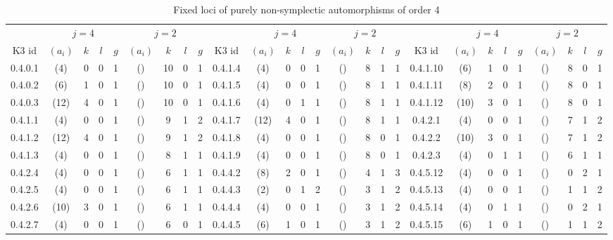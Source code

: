 {\small\centering\setlength{\tabcolsep}{3pt}
\begin{longtable}{ccccccccc|ccccccccc|ccccccccc}
\caption{Fixed loci of purely non-symplectic automorphisms of order 4}\\
 & \multicolumn{4}{c}{$j = 4$} & \multicolumn{4}{c}{$j = 2$} & & \multicolumn{4}{c}{$j = 4$} & \multicolumn{4}{c}{$j = 2$} & & \multicolumn{4}{c}{$j = 4$} & \multicolumn{4}{c}{$j = 2$}\\
\cmidrule(lr){2-5}
\cmidrule(lr){6-9}
\cmidrule(lr){11-14}
\cmidrule(lr){15-18}
\cmidrule(lr){20-23}
\cmidrule(lr){24-27}
K3 id & $(a_i)$ & $k$ & $l$ & $g$ & $(a_i)$ & $k$ & $l$ & $g$ & K3 id & $(a_i)$ & $k$ & $l$ & $g$ & $(a_i)$ & $k$ & $l$ & $g$ & K3 id & $(a_i)$ & $k$ & $l$ & $g$ & $(a_i)$ & $k$ & $l$ & $g$\\
\hline
\endhead
\rowcolor{lightgray}
0.4.0.1 & (4) & 0 & 0 & 1 & () & 10 & 0 & 1 & 0.4.1.4 & (4) & 0 & 0 & 1 & () & 8 & 1 & 1 & 0.4.1.10 & (6) & 1 & 0 & 1 & () & 8 & 0 & 1\\
0.4.0.2 & (6) & 1 & 0 & 1 & () & 10 & 0 & 1 & 0.4.1.5 & (4) & 0 & 0 & 1 & () & 8 & 1 & 1 & 0.4.1.11 & (8) & 2 & 0 & 1 & () & 8 & 0 & 1\\
\rowcolor{lightgray}
0.4.0.3 & (12) & 4 & 0 & 1 & () & 10 & 0 & 1 & 0.4.1.6 & (4) & 0 & 1 & 1 & () & 8 & 1 & 1 & 0.4.1.12 & (10) & 3 & 0 & 1 & () & 8 & 0 & 1\\
0.4.1.1 & (4) & 0 & 0 & 1 & () & 9 & 1 & 2 & 0.4.1.7 & (12) & 4 & 0 & 1 & () & 8 & 1 & 1 & 0.4.2.1 & (4) & 0 & 0 & 1 & () & 7 & 1 & 2\\
\rowcolor{lightgray}
0.4.1.2 & (12) & 4 & 0 & 1 & () & 9 & 1 & 2 & 0.4.1.8 & (4) & 0 & 0 & 1 & () & 8 & 0 & 1 & 0.4.2.2 & (10) & 3 & 0 & 1 & () & 7 & 1 & 2\\
0.4.1.3 & (4) & 0 & 0 & 1 & () & 8 & 1 & 1 & 0.4.1.9 & (4) & 0 & 0 & 1 & () & 8 & 0 & 1 & 0.4.2.3 & (4) & 0 & 1 & 1 & () & 6 & 1 & 1\\
\rowcolor{lightgray}
0.4.2.4 & (4) & 0 & 0 & 1 & () & 6 & 1 & 1 & 0.4.4.2 & (8) & 2 & 0 & 1 & () & 4 & 1 & 3 & 0.4.5.12 & (4) & 0 & 0 & 1 & () & 0 & 2 & 1\\
0.4.2.5 & (4) & 0 & 0 & 1 & () & 6 & 1 & 1 & 0.4.4.3 & (2) & 0 & 1 & 2 & () & 3 & 1 & 2 & 0.4.5.13 & (4) & 0 & 0 & 1 & () & 1 & 1 & 2\\
\rowcolor{lightgray}
0.4.2.6 & (10) & 3 & 0 & 1 & () & 6 & 1 & 1 & 0.4.4.4 & (4) & 0 & 0 & 1 & () & 3 & 1 & 2 & 0.4.5.14 & (4) & 0 & 1 & 1 & () & 0 & 2 & 1\\
0.4.2.7 & (4) & 0 & 0 & 1 & () & 6 & 0 & 1 & 0.4.4.5 & (6) & 1 & 0 & 1 & () & 3 & 1 & 2 & 0.4.5.15 & (6) & 1 & 0 & 1 & () & 1 & 1 & 2\\

\end{longtable}}
